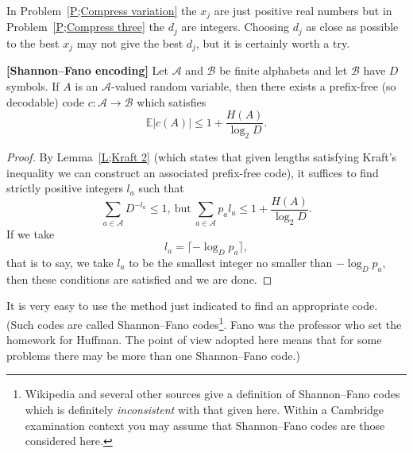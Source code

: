 In Problem~\ref{P;Compress variation}
the $x_{j}$ are just positive real numbers but in
Problem~\ref{P;Compress three} the $d_{j}$ are integers.
Choosing $d_{j}$ as close as possible to the best $x_{j}$
may not give the best $d_{j}$, but it is certainly worth a try.
\begin{theorem}\label{T;Shannon--Fano}{\bf[Shannon--Fano encoding]} 
Let ${\mathcal A}$ and ${\mathcal B}$
be finite alphabets and let ${\mathcal B}$ have $D$ symbols. If 
$A$ is an ${\mathcal A}$-valued random variable, 
then there exists
a prefix-free (so decodable) code 
$c:{\mathcal A}\rightarrow{\mathcal B}$
which satisfies 
\[{\mathbb E}|c(A)|\leq 1+\frac{H(A)}{\log_{2} D}.\]
\end{theorem}
\begin{proof} By  Lemma~\ref{L;Kraft 2} (which states
that given lengths satisfying
Kraft's inequality we can construct an associated
prefix-free code), it suffices to find strictly
positive integers $l_{a}$ such that
\[\sum_{a\in {\mathcal A}}D^{-l_{a}}\leq 1,
\ \text{but}
\ \sum_{a\in {\mathcal A}}p_{a}l_{a}\leq 1+\frac{H(A)}{\log_{2} D}.\]
If we take
\[l_{a}=\lceil -\log_{D} p_{a}\rceil,\]
that is to say, we take $l_{a}$ to be the smallest integer
no smaller than $-\log_{D} p_{a}$, then these conditions 
are satisfied and we are done.
\end{proof}
It is very easy to use the method just indicated to
find an appropriate code. (Such codes are called Shannon--Fano
codes\footnote{Wikipedia and several other sources give
a definition of Shannon--Fano codes which is 
definitely \emph{inconsistent} with that given here.
Within a Cambridge examination context you may assume
that Shannon--Fano codes are those considered here.}.
Fano was the professor who set the homework for Huffman.
The point of view adopted here means that for some
problems there may be more than one Shannon--Fano
code.)

